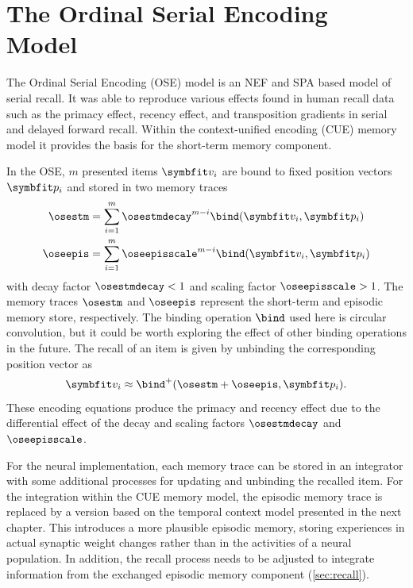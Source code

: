 \chapter{The Ordinal Serial Encoding Model}
The Ordinal Serial Encoding (OSE) model \parencite{Choo2010} is an NEF and SPA based model of serial recall.
It was able to reproduce various effects found in human recall data such as the primacy effect, recency effect, and transposition gradients in serial and delayed forward recall.
Within the context-unified encoding (CUE) memory model it provides the basis for the short-term memory component.

In the OSE, $m$ presented items $\vc v_i$ are bound to fixed position vectors $\vc p_i$ and stored in two memory traces
\begin{align}
    \osestm &= \sum_{i=1}^m \osestmdecay^{m - i} \bind(\vc v_i, \vc p_i) \\
    \oseepis &= \sum_{i=1}^m \oseepisscale^{m - i} \bind(\vc v_i, \vc p_i)
\end{align}
with decay factor $\osestmdecay < 1$ and scaling factor $\oseepisscale > 1$.
The memory traces $\osestm$ and $\oseepis$ represent the short-term and episodic memory store, respectively.
The binding operation $\bind$ used here is circular convolution, but it could be worth exploring the effect of other binding operations in the future.
The recall of an item is given by unbinding the corresponding position vector as
\begin{equation}
    \vc v_i \approx \bind^+(\osestm + \oseepis, \vc p_i) \text{.}
\end{equation}
These encoding equations produce the primacy and recency effect due to the differential effect of the decay and scaling factors $\osestmdecay$ and $\oseepisscale$.

For the neural implementation, each memory trace can be stored in an integrator with some additional processes for updating and unbinding the recalled item.
For the integration within the CUE memory model, the episodic memory trace is replaced by a version based on the temporal context model presented in the next chapter.
This introduces a more plausible episodic memory, storing experiences in actual synaptic weight changes rather than in the activities of a neural population.
In addition, the recall process needs to be adjusted to integrate information from the exchanged episodic memory component (\cref{sec:recall}).


